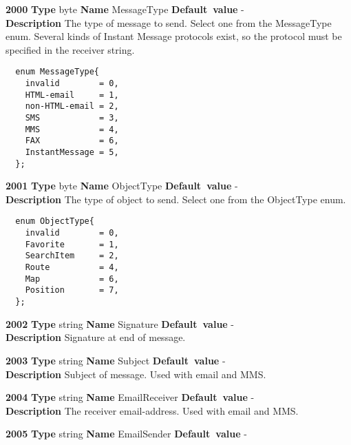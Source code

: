 \documentclass[a4paper]{article}
\begin{document}
\begin{list}{\textbf{ParamID}}{}
\item \textbf{2000} \textbf{Type} byte \textbf{Name} MessageType
                 \textbf{Default~value} - \\
  \label{MessageType}
  \textbf{Description} The type of message to send. Select one from the
  MessageType enum. Several kinds of Instant Message protocols exist,
  so the protocol must be specified in the receiver string.
\begin{verbatim}
  enum MessageType{
    invalid        = 0,
    HTML-email     = 1,
    non-HTML-email = 2,
    SMS            = 3,
    MMS            = 4,
    FAX            = 6,
    InstantMessage = 5,
  };
\end{verbatim}
\item \textbf{2001} \textbf{Type} byte \textbf{Name} ObjectType
                 \textbf{Default~value} - \\
  \label{ObjectType}
  \textbf{Description} The type of object to send. Select one from the
  ObjectType enum.
\begin{verbatim}
  enum ObjectType{
    invalid        = 0,
    Favorite       = 1,
    SearchItem     = 2,
    Route          = 4,
    Map            = 6,
    Position       = 7,
  };
\end{verbatim}
\item \textbf{2002} \textbf{Type} string \textbf{Name} Signature
                 \textbf{Default~value} - \\
  \label{Signature}
  \textbf{Description} Signature at end of message.
\item \textbf{2003} \textbf{Type} string \textbf{Name} Subject
                 \textbf{Default~value} - \\
  \label{Subject}
  \textbf{Description} Subject of message. Used with email and MMS.
\item \textbf{2004} \textbf{Type} string \textbf{Name} EmailReceiver
                 \textbf{Default~value} - \\
  \label{EmailReceiver}
  \textbf{Description} The receiver email-address. Used with email and MMS.
\item \textbf{2005} \textbf{Type} string \textbf{Name} EmailSender
                 \textbf{Default~value} - \\

\end{list}
\end{document}
